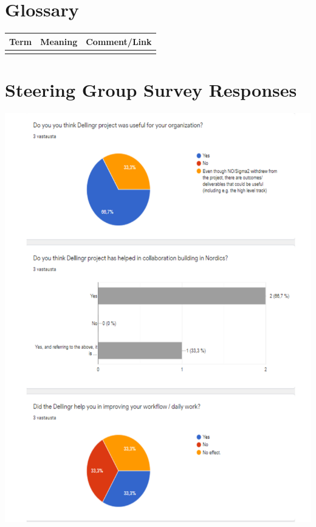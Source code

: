 \documentclass{article}
\begin{document}
\begin{appendices}
\begin{itemize}
\end{itemize}

\section{Glossary}

\begin{tabular}{l|l|l}
Term & Meaning & Comment/Link \\ \hline
 & &  \\ \hline
\end{tabular}

\section{Steering Group Survey Responses}
\label{app:sg-resp}

\begin{center}
\includegraphics[scale=0.7]{SG_responses_1.pdf}
\end{center}


\end{appendices}
\end{document}
